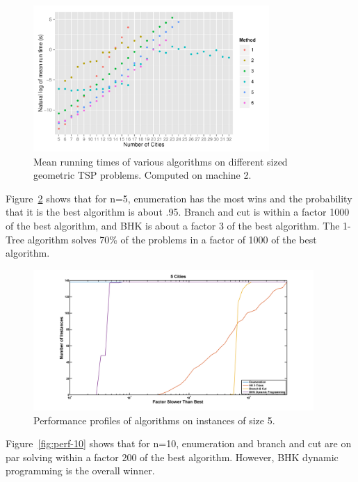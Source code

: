 \documentclass[11pt]{article}
\begin{document}
	\begin{figure}[H]
		\center
		\includegraphics[width=0.8\textwidth]{b40-log}
		\caption{Mean running times of various algorithms on different sized geometric TSP problems. Computed on machine 2.}
		\label{fig:m2-runtime}
	\end{figure}
	
	Figure~\ref{fig:perf-5} shows that for n=5, enumeration has the most wins and the probability that it is the best algorithm is about .95. Branch and cut is within a factor 1000 of the best algorithm, and BHK is about a factor 3 of the best algorithm. The 1-Tree algorithm solves 70\% of the problems in a factor of 1000 of the best algorithm. 

	\begin{figure}[H]
		\center
		\includegraphics[width=0.95\textwidth]{../performanceplots/perf5.png}
		\caption{Performance profiles of algorithms on instances of size 5.}
		\label{fig:perf-5}
	\end{figure}
	
	Figure~\ref{fig:perf-10} shows that for n=10, enumeration and branch and cut are on par solving within a factor 200 of the best algorithm. However, BHK dynamic programming is the overall winner. 
		
\end{document}

